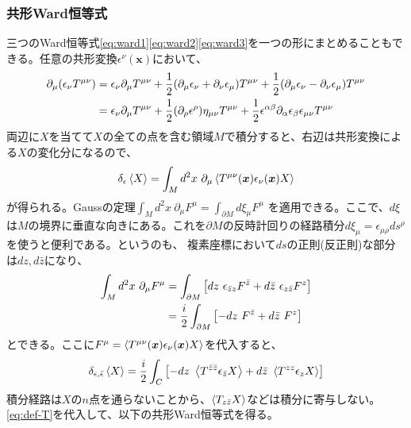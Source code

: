 \documentclass[11pt, aps, longbibliography]{article}
\numberwithin{equation}{section}
\begin{document}
    \subsubsection{共形Ward恒等式}
        三つのWard恒等式\eqref{eq:ward1}\eqref{eq:ward2}\eqref{eq:ward3}を一つの形にまとめることもできる。任意の共形変換$\epsilon^\nu(\bm{x})$において、
        \begin{align}
            \partial_\mu(\epsilon_\nu T^{\mu\nu}) &= \epsilon_{\nu}\partial_\mu T^{\mu\nu} + \frac{1}{2}(\partial_\mu \epsilon_\nu + \partial_\nu \epsilon_\mu)T^{\mu\nu} + \frac{1}{2}(\partial_\mu \epsilon_\nu - \partial_\nu \epsilon_\mu)T^{\mu\nu} \notag \\
            &= \epsilon_{\nu}\partial_\mu T^{\mu\nu} + \frac{1}{2}(\partial_\rho \epsilon^{\rho})\eta_{\mu\nu}T^{\mu\nu} + \frac{1}{2}\epsilon^{\alpha\beta}\partial_\alpha \epsilon_\beta \epsilon_{\mu\nu}T^{\mu\nu} 
        \end{align}
        両辺に$X$を当てて$X$の全ての点を含む領域$M$で積分すると、右辺は共形変換による$X$の変化分になるので、
        \begin{equation}
            \delta_\epsilon \expval{X} = \int_M d^2x \ \partial_\mu \expval{T^{\mu\nu}(\bm{x})\epsilon_\nu(\bm{x})X}
        \end{equation}
        が得られる。Gaussの定理$\int_M d^2x \ \partial_\mu F^\mu = \int_{\partial M}d\xi_\mu F^\mu$
        を適用できる。ここで、$d\xi$は$M$の境界に垂直な向きにある。これを$\partial M$の反時計回りの経路積分$d\xi_\mu = \epsilon_{\mu\rho}ds^\rho$を使うと便利である。というのも、
        複素座標において$ds$の正則(反正則)な部分は$dz, d\bar{z}$になり、
        \begin{align}
            \int_M d^2x \ \partial_\mu F^\mu &= \int_{\partial M} \left[ dz \ \epsilon_{\bar{z}z}F^{\bar{z}} + d\bar{z} \ \epsilon_{z\bar{z}}F^z \right] \notag \\
            &= \frac{i}{2} \int_{\partial M} \left[ -dz \ F^{\bar{z}} + d\bar{z} \ F^z \right]
        \end{align}
        とできる。ここに$F^\mu = \expval{T^{\mu\nu}(\bm{x})\epsilon_\nu(\bm{x})X}$を代入すると、
        \begin{equation}
            \delta_{\epsilon, \bar{\epsilon}}\expval{X} = \frac{i}{2}\int_C \left[ -dz \ \expval{T^{\bar{z}\bar{z}}\epsilon_{\bar{z}}X} + d\bar{z} \ \expval{T^{zz}\epsilon_z X} \right]
        \end{equation}
        積分経路は$X$の$n$点を通らないことから、$\expval{T_{z\bar{z}}X}$などは積分に寄与しない。\eqref{eq:def-T}を代入して、以下の共形Ward恒等式を得る。
\end{document}

